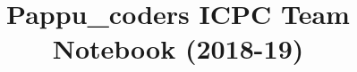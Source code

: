 \documentclass[12pt]{article}
\title{\vspace{-4ex}\Large{Pappu\_coders ICPC Team Notebook (2018-19)}}
\author{}
\date{}
\begin{document}
	\begin{landscape}
		\begin{multicols}{2}
			
			\maketitle
			\vspace{-13ex}
			\tableofcontents
			\pagestyle{fancy}
			
			
			
		\end{multicols}
	\end{landscape}
\end{document}
